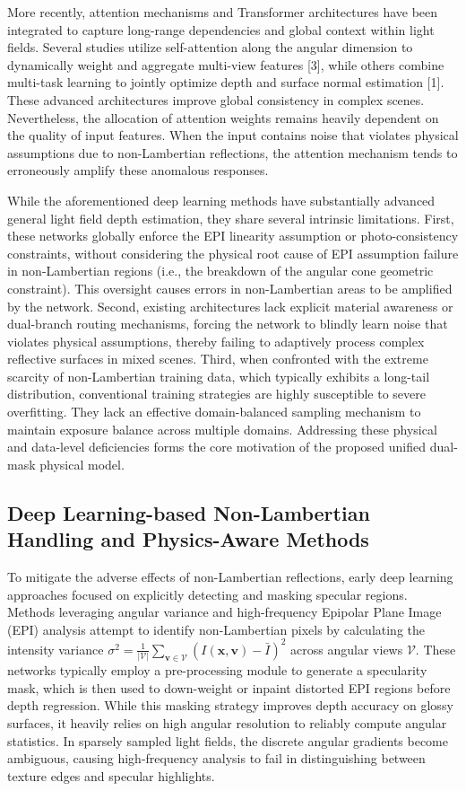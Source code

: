 More recently, attention mechanisms and Transformer architectures have been integrated to capture long-range dependencies and global context within light fields. Several studies utilize self-attention along the angular dimension to dynamically weight and aggregate multi-view features [3], while others combine multi-task learning to jointly optimize depth and surface normal estimation [1]. These advanced architectures improve global consistency in complex scenes. Nevertheless, the allocation of attention weights remains heavily dependent on the quality of input features. When the input contains noise that violates physical assumptions due to non-Lambertian reflections, the attention mechanism tends to erroneously amplify these anomalous responses.

While the aforementioned deep learning methods have substantially advanced general light field depth estimation, they share several intrinsic limitations. First, these networks globally enforce the EPI linearity assumption or photo-consistency constraints, without considering the physical root cause of EPI assumption failure in non-Lambertian regions (i.e., the breakdown of the angular cone geometric constraint). This oversight causes errors in non-Lambertian areas to be amplified by the network. Second, existing architectures lack explicit material awareness or dual-branch routing mechanisms, forcing the network to blindly learn noise that violates physical assumptions, thereby failing to adaptively process complex reflective surfaces in mixed scenes. Third, when confronted with the extreme scarcity of non-Lambertian training data, which typically exhibits a long-tail distribution, conventional training strategies are highly susceptible to severe overfitting. They lack an effective domain-balanced sampling mechanism to maintain exposure balance across multiple domains. Addressing these physical and data-level deficiencies forms the core motivation of the proposed unified dual-mask physical model.

\subsection{Deep Learning-based Non-Lambertian Handling and Physics-Aware Methods}

To mitigate the adverse effects of non-Lambertian reflections, early deep learning approaches focused on explicitly detecting and masking specular regions. Methods leveraging angular variance and high-frequency Epipolar Plane Image (EPI) analysis attempt to identify non-Lambertian pixels by calculating the intensity variance $\sigma^2 = \frac{1}{|\mathcal{V}|} \sum_{\mathbf{v} \in \mathcal{V}} (I(\mathbf{x}, \mathbf{v}) - \bar{I})^2$ across angular views $\mathcal{V}$. These networks typically employ a pre-processing module to generate a specularity mask, which is then used to down-weight or inpaint distorted EPI regions before depth regression. While this masking strategy improves depth accuracy on glossy surfaces, it heavily relies on high angular resolution to reliably compute angular statistics. In sparsely sampled light fields, the discrete angular gradients become ambiguous, causing high-frequency analysis to fail in distinguishing between texture edges and specular highlights.


